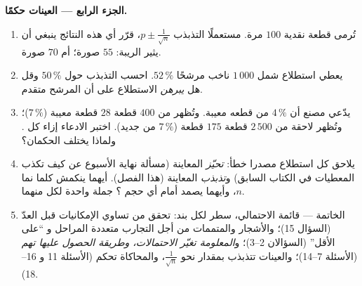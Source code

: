 \begin{problem}
\medskip
\noindent\textbf{الجزء الرابع --- العينات حكمًا.}
\begin{enumerate}[resume]
  \item تُرمى قطعة نقدية $100$ مرة. مستعملًا  التذبذب
        $p \pm \frac{1}{\sqrt n}$، قرّر أي هذه
        النتائج ينبغي أن يثير الريبة: $55$ صورة؛ أم $70$
        صورة.
  \item يعطي استطلاع شمل $1\,000$ ناخب مرشحًا $52\,\%$.
        احسب  التذبذب حول $50\,\%$ وقل
        هل \emph{يبرهن} الاستطلاع على أن المرشح
        متقدم.
  \item يدّعي مصنع أن $4\,\%$ من قطعه معيبة. وتُظهر  من
        $400$ قطعة $28$ قطعة معيبة ($7\,\%$)؛ وتُظهر  لاحقة من
        $2\,500$ قطعة $175$ قطعة ($7\,\%$ من جديد). اختبر الادعاء
        إزاء كل . ولماذا يختلف الحكمان؟
  \item يلاحق كل استطلاع مصدرا خطأ: \emph{تحيّز}
        المعاينة (مسألة نهاية الأسبوع عن كيف تكذب المعطيات في الكتاب السابق) و\emph{تذبذب}
        المعاينة (هذا الفصل). أيهما ينكمش كلما نما
        $n$، وأيهما يصمد أمام أي حجم ؟ جملة
        واحدة لكل منهما.
  \item الخاتمة --- قائمة الاحتمالي، سطر لكل
        بند: تحقق من تساوي  الإمكانيات قبل العدّ
        (السؤال 15)؛ والأشجار والمتممات من أجل التجارب متعددة المراحل و
        ``على الأقل'' (السؤالان 2--3)؛ و\emph{المعلومة
        تغيّر الاحتمالات، وطريقة الحصول عليها تهم}
        (الأسئلة 7--14)؛ والعينات تتذبذب بمقدار نحو
        $\frac{1}{\sqrt n}$، والمحاكاة تحكم
        (الأسئلة 11 و 16--18).
\end{enumerate}
\end{problem}
